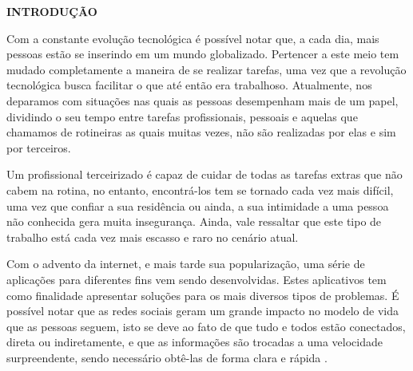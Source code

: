 \begin{flushleft}
	\vspace{1.2em}
	\textbf{\large INTRODUÇÃO}
	\vspace{2.9em}
\end{flushleft}
\thispagestyle{empty}


\par Com a constante evolução tecnológica é possível notar que, a cada dia, mais pessoas estão se inserindo em um mundo globalizado. Pertencer a este meio tem mudado completamente a maneira de se realizar tarefas, uma vez que a revolução tecnológica busca facilitar o que até então era trabalhoso. Atualmente, nos deparamos com situações nas quais as pessoas desempenham mais de um papel, dividindo o seu tempo entre tarefas profissionais, pessoais e aquelas que chamamos de rotineiras as quais muitas vezes, não são realizadas por elas e sim por terceiros.

\par Um profissional terceirizado é capaz de cuidar de todas as tarefas extras que não cabem na rotina, no entanto, encontrá-los tem se tornado cada vez mais difícil, uma vez que confiar a sua residência ou ainda, a sua intimidade a uma pessoa não conhecida gera muita insegurança. Ainda, vale ressaltar que este tipo de trabalho está cada vez mais escasso e raro no cenário atual.

\par Com o advento da internet, e mais tarde sua popularização, uma série de aplicações para diferentes fins vem sendo desenvolvidas. Estes aplicativos tem como finalidade apresentar soluções para os mais diversos tipos de problemas. É possível notar que as redes sociais geram um grande impacto no modelo de vida que as pessoas seguem, isto se deve ao fato de que tudo e todos estão conectados, direta ou indiretamente, e que as informações são trocadas a uma velocidade surpreendente, sendo necessário obtê-las de forma clara e rápida \cite{barbosa_why_people_use_social_network}.

\par%

